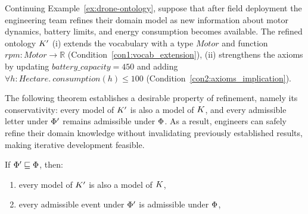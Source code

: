 \begin{example}
Continuing Example~\ref{ex:drone-ontology}, suppose that after field
deployment the engineering team refines their domain model as new
information about motor dynamics, battery limits, and energy
consumption becomes available. The refined
ontology $K'$ (i) extends the vocabulary with a type
$\mathit{Motor}$ and function $\mathit{rpm} : \mathit{Motor} \to
\mathbb{R}$ (Condition~\ref{con1:vocab_extension}), (ii) strengthens the
axioms by updating $\mathit{battery\_capacity} = 450$ and adding
$\forall h : \mathit{Hectare}.\ \mathit{consumption}(h) \leq 100$
(Condition~\ref{con2:axioms_implication}).
\end{example}

The following theorem establishes a desirable property of refinement, namely its conservativity: every model of $K'$ is also a model of $K$, and every admissible letter under $\Phi'$ remains admissible under $\Phi$. As a result, engineers can safely refine their domain knowledge without invalidating previously established results, making iterative development feasible.


\begin{theorem}
\label{thm:conservative-refinement}
If $\Phi' \sqsubseteq \Phi$, then:
\begin{enumerate}[label=\Roman*), ref=\Roman*]
    \item\label{con:1} every model of $K'$ is also a model of $K$,
    \item\label{con:2} every admissible event under $\Phi'$ is 
    admissible under $\Phi$,
\end{enumerate}
\end{theorem}



